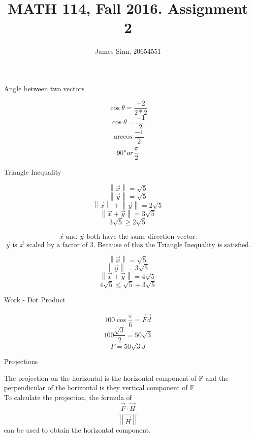 \documentclass[12pt]{article}
\newcommand{\dbarl}{\left\lVert}
\newcommand{\dbarr}{\right\rVert}
\newenvironment{problem}[2][Problem]{\begin{trivlist}
\item[\hskip \labelsep {\bfseries #1}\hskip \labelsep {\bfseries #2.}]}{\end{trivlist}}
\begin{document}

\title{MATH 114, Fall 2016. Assignment 2}
\author{James Sinn, 20654551}
\maketitle

\begin{problem}{1}
	Angle between two vectors
\end{problem}

	\[\cos\theta = \frac{-2}{2*2}\]
	\[\cos\theta = \frac {-1}{2}\]
	\[\arccos{\frac{-1}{2}}\]
	\[90\degree or \frac{\pi}{2}\]

\begin{problem}{2}
	Triangle Inequality
\end{problem}
	\[\dbarl\vec x\dbarr = \sqrt{5}\]
	\[\dbarl\vec y\dbarr = \sqrt{5}\]
	\[\dbarl\vec x\dbarr + \dbarl\vec y\dbarr = 2\sqrt{5}\]
	\[\dbarl\vec x + \vec y \dbarr = 3\sqrt{5}\]
	\[3\sqrt{5} \geq 2\sqrt{5}\]

	\[\vec x \text{ and } \vec y \text{ both have the same direction vector.}\]
	\[\vec y \text{ is } \vec x \text{ scaled by a factor of 3. Because of this the Triangle Inequality is satisfied.}\]

	\[\dbarl \vec x\dbarr = \sqrt{5}\]
	\[\dbarl \vec y\dbarr = 3\sqrt{5}\]
	\[\dbarl \vec x + \vec y\dbarr = 4\sqrt{5}\]
	\[ 4\sqrt{5} \leq \sqrt{5} + 3\sqrt{5} \]


\begin{problem}{3}
	Work - Dot Product
\end{problem}

	\[ 100\cos{\frac{\pi}{6}} = \vec F \dot \vec d \]
	\[ 100\frac{\sqrt{3}}{2} = 50\sqrt{3}\]
	\[F = 50\sqrt{3}J\] 
\begin{problem}{4}
	Projections
\end{problem}
	The projection on the horizontal is the horizontal component of F and the perpendicular of the horizontal is they vertical component of F\\
	To calculate the projection, the formula of \[\frac{\vec F \cdot \vec H}{\dbarl \vec H \dbarr}\] can be used to obtain the horizontal component. 
\end{document}
